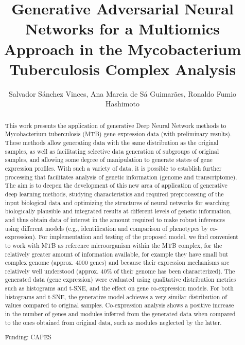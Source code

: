 \documentclass[twoside]{article}
\title{\vspace{-15mm}\fontsize{24pt}{10pt}\selectfont\textbf{ Generative Adversarial Neural Networks for a Multiomics Approach in the Mycobacterium Tuberculosis Complex Analysis }} %
\author{ Salvador S\'anchez Vinces, Ana Marcia de S\'a Guimar\~aes, Ronaldo Fumio Hashimoto }
\affil{ University of S\~ao Paulo }
\date{}
\begin{document}
  
  
  \maketitle %
  
  
  \thispagestyle{fancy} %
  
  
  \begin{abstract}
  This work presents the application of generative Deep Neural Network methods to Mycobacterium tuberculosis (MTB) gene expression data (with preliminary results). These methods allow generating data with the same distribution as the original samples,  as well as facilitating selective data generation of subgroups of original samples,  and allowing some degree of manipulation to generate states of gene expression profiles. With such a variety of data,  it is possible to establish further processing that facilitates analysis of genetic information (genome and transcriptome). The aim is to deepen the development of this new area of application of generative deep learning methods,  studying characteristics and required preprocessing of the input biological data and optimizing the structures of neural networks for searching biologically plausible and integrated results at different levels of genetic information,  and thus obtain data of interest in the amount required to make robust inferences using different models (e.g.,  identification and comparison of phenotypes by co-expression). For implementation and testing of the proposed model,  we find convenient to work with MTB as reference microorganism within the MTB complex,  for the relatively greater amount of information available,  for example they have small but complex genome (approx. 4000 genes) and because their expression mechanisms are relatively well understood (approx. 40\% of their genome has been characterized).  The generated data (gene expression) were evaluated using qualitative distribution metrics such as histograms and t-SNE,  and the effect on gene co-expression models. For both histograms and t-SNE,  the generative model achieves a very similar distribution of values compared to original samples. Co-expression analysis shows a positive increase in the number of genes and modules inferred from the generated data when compared to the ones obtained from original data,  such as modules neglected by the latter.
  
  Funding: CAPES \\ 
  \end{abstract}
  
\end{document}
